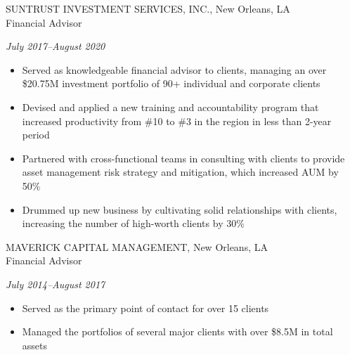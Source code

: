 \documentclass[11pt,letterpaper]{article}
\begin{document}
\vspace{1ex}

\begin{minipage}[t]{0.6\textwidth}
SUNTRUST INVESTMENT SERVICES, INC., New Orleans, LA \\
Financial Advisor
\end{minipage}
\hfill
\begin{minipage}[t]{0.4\textwidth}
\hfill \textit{July 2017--August 2020}
\end{minipage}

\begin{multicols}{2}
\begin{itemize}[leftmargin=1em,noitemsep,topsep=0pt]
    \item Served as knowledgeable financial advisor to clients, managing an over \$20.75M investment portfolio of 90+ individual and corporate clients
    \item Devised and applied a new training and accountability program that increased productivity from \#10 to \#3 in the region in less than 2-year period
    \item Partnered with cross-functional teams in consulting with clients to provide asset management risk strategy and mitigation, which increased AUM by 50\%
    \item Drummed up new business by cultivating solid relationships with clients, increasing the number of high-worth clients by 30\%
\end{itemize}
\end{multicols}

\vspace{1ex}

\begin{minipage}[t]{0.6\textwidth}
MAVERICK CAPITAL MANAGEMENT, New Orleans, LA \\
Financial Advisor
\end{minipage}  
\hfill
\begin{minipage}[t]{0.4\textwidth}
\hfill \textit{July 2014--August 2017}
\end{minipage}

\begin{multicols}{2}
\begin{itemize}[leftmargin=1em,noitemsep,topsep=0pt]
    \item Served as the primary point of contact for over 15 clients  
    \item Managed the portfolios of several major clients with over \$8.5M in total assets
\end{itemize}
\end{multicols}
\end{document}
